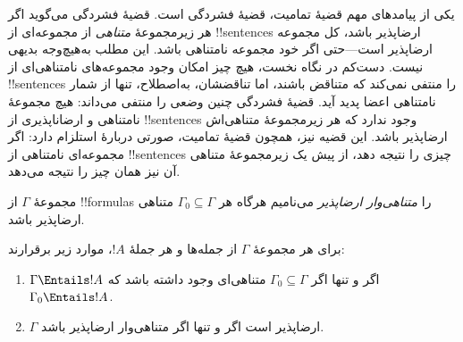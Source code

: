 \documentclass[../../../include/open-logic-section]{subfiles}
\begin{document}
      {}
      {}


یکی از پیامدهای مهم قضیهٔ تمامیت، قضیهٔ فشردگی است. قضیهٔ فشردگی
می‌گوید اگر هر زیرمجموعهٔ \emph{متناهی} از مجموعه‌ای از !!{sentence}s
ارضاپذیر باشد، کل مجموعه ارضاپذیر است---حتی اگر خود مجموعه نامتناهی
باشد. این مطلب به‌هیچ‌وجه بدیهی نیست. دست‌کم در نگاه نخست، هیچ چیز امکان
وجود مجموعه‌های نامتناهی‌ای از !!{sentence}s را منتفی نمی‌کند که متناقض
باشند، اما تناقضشان، به‌اصطلاح، تنها از شمار نامتناهی اعضا پدید آید.
قضیهٔ فشردگی چنین وضعی را منتفی می‌داند: هیچ مجموعهٔ نامتناهی و
ارضا‌ناپذیری از !!{sentence}s وجود ندارد که هر زیرمجموعهٔ متناهی‌اش
ارضاپذیر باشد. این قضیه نیز، همچون قضیهٔ تمامیت، صورتی دربارهٔ استلزام
دارد: اگر مجموعه‌ای نامتناهی از !!{sentence}s چیزی را نتیجه دهد، از پیش
یک زیرمجموعهٔ متناهی آن نیز همان چیز را نتیجه می‌دهد.

\begin{defn}
  مجموعهٔ $\Gamma$ از !!{formula}s را \emph{متناهی‌وار ارضاپذیر}
  می‌نامیم هرگاه هر $\Gamma_0 \subseteq \Gamma$ متناهی ارضاپذیر باشد.
\end{defn}

\begin{thm}
برای هر مجموعهٔ $\Gamma$ از جمله‌ها و هر جملهٔ $!A$، موارد زیر برقرارند:
\begin{enumerate}
  \item $\Gamma \Entails !A$ اگر و تنها اگر $\Gamma_0
    \subseteq \Gamma$ متناهی‌ای وجود داشته باشد که
    $\Gamma_0 \Entails !A$.
  \item $\Gamma$ ارضاپذیر است اگر و تنها اگر متناهی‌وار
    ارضاپذیر باشد.
\end{enumerate}
\end{thm}
\end{document}
